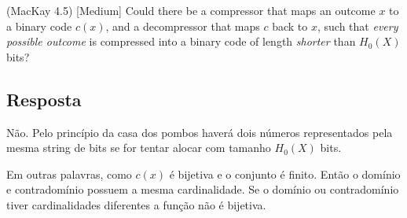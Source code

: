 (MacKay 4.5) [Medium] Could there be a compressor that maps an outcome $x$ to a binary code $c(x)$, and a decompressor that maps $c$ back to $x$, such that \textit{every possible outcome} is compressed into a binary code of length \textit{shorter} than $H_0(X)$ bits?

\subsection*{Resposta}

Não. Pelo princípio da casa dos pombos haverá dois números representados pela mesma string de bits se for tentar alocar com tamanho $H_0(X)$ bits.

Em outras palavras, como $c(x)$ é bijetiva e o conjunto é finito. Então o domínio e contradomínio possuem a mesma cardinalidade. Se o domínio ou contradomínio tiver cardinalidades diferentes a função não é bijetiva. 